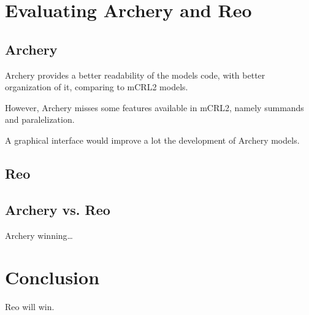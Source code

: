 \documentclass[a4paper]{article}
\newcommand{\ar}{Archery\xspace}
\newcommand{\re}{Reo\xspace}
\newcommand{\mcrl}{mCRL2\xspace}
\begin{document}


%
%
\section{Evaluating \ar and \re}

\subsection{\ar}

\ar provides a better readability of the models code, with better organization of it,
comparing to \mcrl models.

However, \ar misses some features available in \mcrl, namely summands and paralelization.

A graphical interface would improve a lot the development of Archery models.

\subsection{\re}

\subsection{\ar vs. \re}

\ar winning\dots

\section{Conclusion}
%
%

\re will win. 
\end{document}
